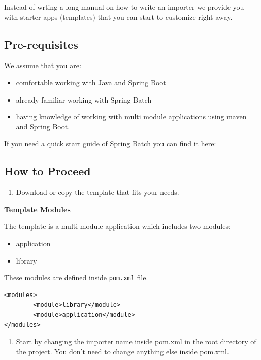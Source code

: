 \documentclass{llncs}
\providecommand{\tightlist}{%
  \setlength{\itemsep}{0pt}\setlength{\parskip}{0pt}}
\begin{document}
Instead of wrting a long manual on how to write an importer we provide
you with starter apps (templates) that you can start to customize right
away.

\subsection{Pre-requisites}

We assume that you are:

\begin{itemize}
\tightlist
\item
  comfortable working with Java and Spring Boot
\item
  already familiar working with Spring Batch
\item
  having knowledge of working with multi module applications using maven
  and Spring Boot.
\end{itemize}

If you need a quick start guide of Spring Batch you can find it
\href{https://projects.spring.io/spring-batch/}{here:}

\subsection{How to Proceed}

\begin{enumerate}
\def\labelenumi{\arabic{enumi}.}
\tightlist
\item
  Download or copy the template that fits your needs.
\end{enumerate}

\textbf{Template Modules}

The template is a multi module application which includes two modules:

\begin{itemize}
\tightlist
\item
  application
\item
  library
\end{itemize}

These modules are defined inside \texttt{pom.xml} file.

\begin{verbatim}
<modules>
        <module>library</module>
        <module>application</module>
</modules>
\end{verbatim}

\begin{enumerate}
\def\labelenumi{\arabic{enumi}.}
\setcounter{enumi}{1}
\tightlist
\item
  Start by changing the importer name inside pom.xml in the root
  directory of the project. You don't need to change anything else
  inside pom.xml.
\end{enumerate}
\end{document}
